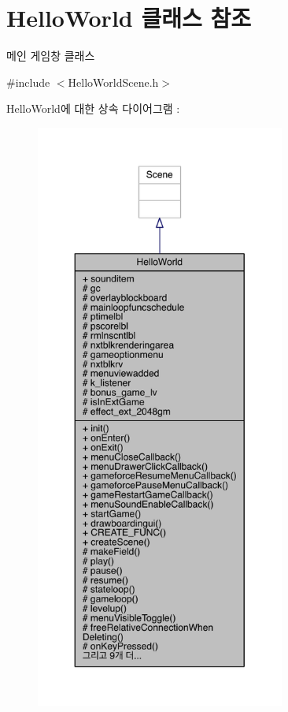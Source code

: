 \hypertarget{class_hello_world}{}\section{Hello\+World 클래스 참조}
\label{class_hello_world}


메인 게임창 클래스  




{\ttfamily \#include $<$Hello\+World\+Scene.\+h$>$}



Hello\+World에 대한 상속 다이어그램 \+: 
\nopagebreak
\begin{figure}[H]
\begin{center}
\leavevmode
\includegraphics[height=550pt]{class_hello_world__inherit__graph}
\end{center}
\end{figure}


